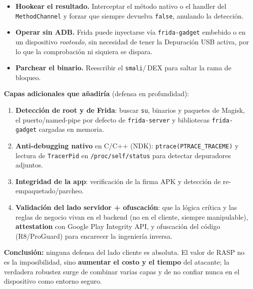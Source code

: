 \documentclass[12pt, a4paper]{article}
\begin{document}
\begin{itemize}\itemsep2pt
    \item \textbf{Hookear el resultado.} Interceptar el método nativo o el
    handler del \texttt{MethodChannel} y forzar que siempre devuelva
    \texttt{false}, anulando la detección.
    \item \textbf{Operar sin ADB.} Frida puede inyectarse vía
    \texttt{frida-gadget} embebido o en un dispositivo \textit{rooteado}, sin
    necesidad de tener la Depuración USB activa, por lo que la comprobación ni
    siquiera se dispara.
    \item \textbf{Parchear el binario.} Reescribir el \texttt{smali}/\,DEX para
    saltar la rama de bloqueo.
\end{itemize}

\textbf{Capas adicionales que añadiría} (defensa en profundidad):
\begin{enumerate}\itemsep2pt
    \item \textbf{Detección de root y de Frida}: buscar \texttt{su}, binarios y
    paquetes de Magisk, el puerto/named-pipe por defecto de \texttt{frida-server}
    y bibliotecas \texttt{frida-gadget} cargadas en memoria.
    \item \textbf{Anti-debugging nativo} en C/C++ (NDK):
    \texttt{ptrace(PTRACE\_TRACEME)} y lectura de \texttt{TracerPid} en
    \texttt{/proc/self/status} para detectar depuradores adjuntos.
    \item \textbf{Integridad de la app}: verificación de la firma APK y
    detección de re-empaquetado/parcheo.
    \item \textbf{Validación del lado servidor + ofuscación}: que la lógica
    crítica y las reglas de negocio vivan en el backend (no en el cliente,
    siempre manipulable), \textbf{attestation} con Google Play Integrity API, y
    ofuscación del código (R8/ProGuard) para encarecer la ingeniería inversa.
\end{enumerate}

\noindent\textbf{Conclusión:} ninguna defensa del lado cliente es absoluta. El
valor de RASP no es la imposibilidad, sino \textbf{aumentar el costo y el
tiempo} del atacante; la verdadera robustez surge de combinar varias capas y de
no confiar nunca en el dispositivo como entorno seguro.
\end{document}
